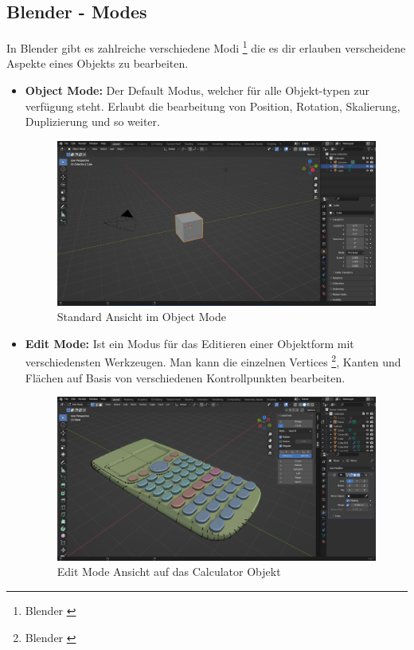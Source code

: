\subsection{Blender - Modes}
In Blender gibt es zahlreiche verschiedene Modi \footnote{Blender \cite{Modi}} die es dir erlauben verscheidene Aspekte
eines Objekts zu bearbeiten.
\begin{itemize}
\item \textbf{Object Mode:} Der Default Modus, welcher für alle Objekt-typen zur verfügung steht. Erlaubt die bearbeitung
von Position, Rotation, Skalierung, Duplizierung und so weiter.
\begin{figure}[h]
\centering
\includegraphics[width=1\textwidth]{images/defaultobjectmode.png}
\caption{Standard Ansicht im Object Mode}
\label{fig:defaultobjectmode}
\end{figure}

\item \textbf{Edit Mode:} Ist ein Modus für das Editieren einer Objektform mit verschiedensten Werkzeugen. Man kann die
einzelnen Vertices \footnote{Blender \cite{Vertices}}, Kanten und Flächen auf Basis von verschiedenen Kontrollpunkten bearbeiten.
\begin{figure}[h]
\centering
\includegraphics[width=1\textwidth]{images/calculatoreditmode.png}
\caption{Edit Mode Ansicht auf das Calculator Objekt}
\label{fig:calculatoreditmode}
\end{figure}


\end{itemize}
